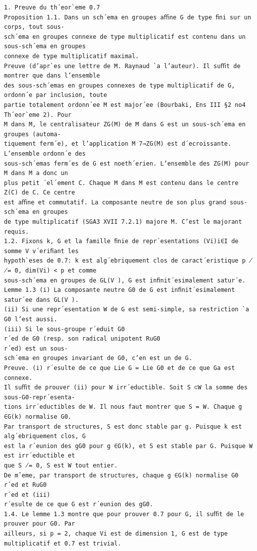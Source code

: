 \documentclass[10pt]{article}
\begin{document}
\begin{verbatim}
1. Preuve du th´eor`eme 0.7
Proposition 1.1. Dans un sch´ema en groupes aﬃne G de type ﬁni sur un corps, tout sous-
sch´ema en groupes connexe de type multiplicatif est contenu dans un sous-sch´ema en groupes
connexe de type multiplicatif maximal.
Preuve (d’apr`es une lettre de M. Raynaud `a l’auteur). Il suﬃt de montrer que dans l’ensemble
des sous-sch´emas en groupes connexes de type multiplicatif de G, ordonn´e par inclusion, toute
partie totalement ordonn´ee M est major´ee (Bourbaki, Ens III §2 no4 Th´eor`eme 2). Pour
M dans M, le centralisateur ZG(M) de M dans G est un sous-sch´ema en groupes (automa-
tiquement ferm´e), et l’application M 7→ZG(M) est d´ecroissante. L’ensemble ordonn´e des
sous-sch´emas ferm´es de G est noeth´erien. L’ensemble des ZG(M) pour M dans M a donc un
plus petit ´el´ement C. Chaque M dans M est contenu dans le centre Z(C) de C. Ce centre
est aﬃne et commutatif. La composante neutre de son plus grand sous-sch´ema en groupes
de type multiplicatif (SGA3 XVII 7.2.1) majore M. C’est le majorant requis.
1.2. Fixons k, G et la famille ﬁnie de repr´esentations (Vi)i∈I de somme V v´eriﬁant les
hypoth`eses de 0.7: k est alg´ebriquement clos de caract´eristique p ̸= 0, dim(Vi) < p et comme
sous-sch´ema en groupes de GL(V ), G est inﬁnit´esimalement satur´e.
Lemme 1.3 (i) La composante neutre G0 de G est inﬁnit´esimalement satur´ee dans GL(V ).
(ii) Si une repr´esentation W de G est semi-simple, sa restriction `a G0 l’est aussi.
(iii) Si le sous-groupe r´eduit G0
r´ed de G0 (resp. son radical unipotent RuG0
r´ed) est un sous-
sch´ema en groupes invariant de G0, c’en est un de G.
Preuve. (i) r´esulte de ce que Lie G = Lie G0 et de ce que Ga est connexe.
Il suﬃt de prouver (ii) pour W irr´eductible. Soit S ⊂W la somme des sous-G0-repr´esenta-
tions irr´eductibles de W. Il nous faut montrer que S = W. Chaque g ∈G(k) normalise G0.
Par transport de structures, S est donc stable par g. Puisque k est alg´ebriquement clos, G
est la r´eunion des gG0 pour g ∈G(k), et S est stable par G. Puisque W est irr´eductible et
que S ̸= 0, S est W tout entier.
De mˆeme, par transport de structures, chaque g ∈G(k) normalise G0
r´ed et RuG0
r´ed et (iii)
r´esulte de ce que G est r´eunion des gG0.
1.4. Le lemme 1.3 montre que pour prouver 0.7 pour G, il suﬃt de le prouver pour G0. Par
ailleurs, si p = 2, chaque Vi est de dimension 1, G est de type multiplicatif et 0.7 est trivial.


\end{verbatim}
\end{document}
